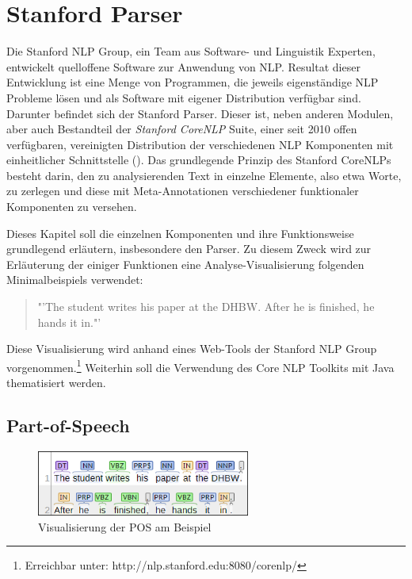 \section{Stanford Parser}
\label{sec:stanfordparser}

Die Stanford \ac{NLP} Group, ein Team aus Software- und Linguistik Experten, entwickelt quelloffene Software zur Anwendung von \ac{NLP}. Resultat dieser Entwicklung ist eine Menge von Programmen, die jeweils eigenständige \ac{NLP} Probleme lösen und als Software mit eigener Distribution verfügbar sind. Darunter befindet sich der Stanford Parser. Dieser ist, neben anderen Modulen, aber auch Bestandteil der \textit{Stanford CoreNLP} Suite, einer seit 2010 offen verfügbaren, vereinigten Distribution der verschiedenen \ac{NLP} Komponenten mit einheitlicher Schnittstelle (\cite[vgl.][1 ff.]{STANFORDNLP}). Das grundlegende Prinzip des Stanford CoreNLPs besteht darin, den zu analysierenden Text in einzelne Elemente, also etwa Worte, zu zerlegen und diese mit Meta-Annotationen verschiedener funktionaler Komponenten zu versehen.\par
Dieses Kapitel soll die einzelnen Komponenten und ihre Funktionsweise grundlegend erläutern, insbesondere den Parser. Zu diesem Zweck wird zur Erläuterung der einiger Funktionen eine Analyse-Visualisierung folgenden Minimalbeispiels verwendet:
\begin{quote}
"'The student writes his paper at the DHBW. After he is finished, he hands it in."'
\end{quote} Diese Visualisierung wird anhand eines Web-Tools der Stanford \ac{NLP} Group vorgenommen.\footnote{Erreichbar unter: http://nlp.stanford.edu:8080/corenlp/} Weiterhin soll die Verwendung des Core NLP Toolkits mit Java thematisiert werden. 

\subsection{Part-of-Speech}
\label{subsec:pos}

\begin{figure}
\includegraphics[width=7cm]{pictures/POS.png}
\caption{Visualisierung der POS am Beispiel}
\label{fig:POS}
\end{figure}

